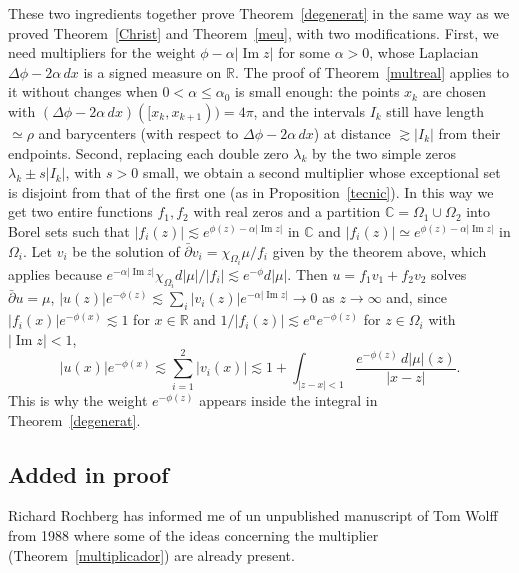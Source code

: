 \documentclass[12pt,twoside,final,psamsfonts]{amsart}
\theoremstyle{plain}
\theoremstyle{remark}
\theoremstyle{definition}
\newcommand{\C}{{\mathbb C}}
\newcommand{\R}{{\mathbb R}}
\newcommand{\dbar}{\bar\partial}
\renewcommand{\Im}{\operatorname{Im}}
\begin{document}
These two ingredients together prove Theorem~\ref{degenerat} in the same way 
as we proved Theorem~\ref{Christ} and Theorem~\ref{meu}, with two
modifications. First, we need multipliers for the weight $\phi-\alpha|\Im z|$
for some $\alpha>0$, whose Laplacian $\Delta\phi-2\alpha\,dx$ is a signed
measure on $\R$. The proof of Theorem~\ref{multreal} applies to it without
changes when $0<\alpha\le\alpha_0$ is small enough: the points $x_k$ are
chosen with $(\Delta\phi-2\alpha\,dx)([x_k,x_{k+1}))=4\pi$, and the intervals
$I_k$ still have length $\simeq\rho$ and barycenters (with respect to
$\Delta\phi-2\alpha\,dx$) at distance $\gtrsim|I_k|$ from their endpoints.
Second, replacing each double zero $\lambda_k$ by the two simple zeros
$\lambda_k\pm s|I_k|$, with $s>0$ small, we obtain a second multiplier whose
exceptional set is disjoint from that of the first one (as in
Proposition~\ref{tecnic}). In this way we get two entire functions $f_1,f_2$
with real zeros and a partition $\C=\Omega_1\cup\Omega_2$ into Borel sets such
that $|f_i(z)|\lesssim e^{\phi(z)-\alpha|\Im z|}$ in $\C$ and
$|f_i(z)|\simeq e^{\phi(z)-\alpha|\Im z|}$ in $\Omega_i$. Let $v_i$ be the
solution of $\dbar v_i=\chi_{\Omega_i}\mu/f_i$ given by the theorem above,
which applies because $e^{-\alpha|\Im z|}\chi_{\Omega_i}d|\mu|/|f_i|\lesssim
e^{-\phi}d|\mu|$. Then $u=f_1v_1+f_2v_2$ solves $\dbar u=\mu$,
$|u(z)|e^{-\phi(z)}\lesssim\sum_i|v_i(z)|e^{-\alpha|\Im z|}\to 0$ as
$z\to\infty$ and, since $|f_i(x)|e^{-\phi(x)}\lesssim 1$ for $x\in\R$ and
$1/|f_i(z)|\lesssim e^{\alpha}e^{-\phi(z)}$ for $z\in\Omega_i$ with
$|\Im z|<1$,
\[
|u(x)|e^{-\phi(x)}\lesssim\sum_{i=1}^2|v_i(x)|\lesssim
1+\int_{|z-x|<1}\frac{e^{-\phi(z)}\,d|\mu|(z)}{|x-z|}.
\]
This is why the weight $e^{-\phi(z)}$ appears inside the integral in
Theorem~\ref{degenerat}.
\subsection*{Added in proof} Richard Rochberg has informed me of un 
unpublished manuscript of
Tom Wolff from 1988 where some of the ideas concerning the multiplier
(Theorem~\ref{multiplicador}) are already present. 
\end{document}

